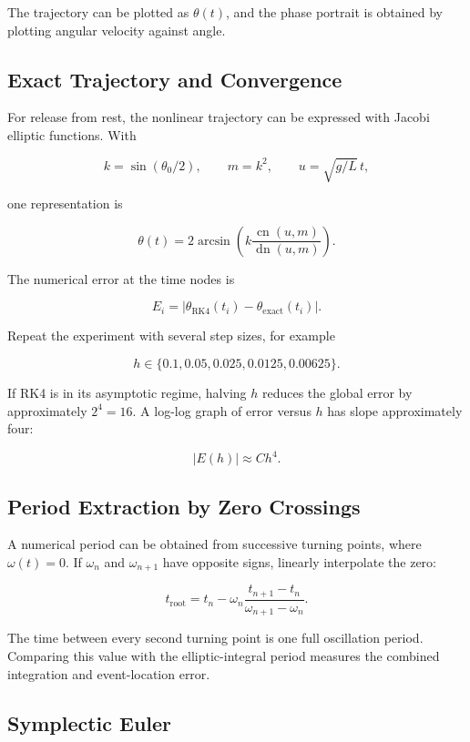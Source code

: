 \documentclass[12pt, a4paper]{article}
\theoremstyle{break}
\begin{document}
The trajectory can be plotted as \(\theta(t)\), and the phase portrait is obtained by plotting angular velocity against angle.

\subsection{Exact Trajectory and Convergence}\label{exact-trajectory-and-convergence}

For release from rest, the nonlinear trajectory can be expressed with Jacobi elliptic functions. With

\[
k=\sin(\theta_0/2),\qquad m=k^2,\qquad u=\sqrt{g/L}\,t,
\]

one representation is

\[
\theta(t)=2\arcsin\left(k\frac{\operatorname{cn}(u,m)}{\operatorname{dn}(u,m)}\right).
\]

The numerical error at the time nodes is

\[
E_i=|\theta_{\mathrm{RK4}}(t_i)-\theta_{\mathrm{exact}}(t_i)|.
\]

Repeat the experiment with several step sizes, for example

\[
h\in\{0.1,0.05,0.025,0.0125,0.00625\}.
\]

If RK4 is in its asymptotic regime, halving \(h\) reduces the global error by approximately \(2^4=16\). A log-log graph of error versus \(h\) has slope approximately four:

\[
|E(h)|\approx Ch^4.
\]

\subsection{Period Extraction by Zero Crossings}\label{period-extraction-by-zero-crossings}

A numerical period can be obtained from successive turning points, where \(\omega(t)=0\). If \(\omega_n\) and \(\omega_{n+1}\) have opposite signs, linearly interpolate the zero:

\[
t_{\mathrm{root}}=t_n-\omega_n\frac{t_{n+1}-t_n}{\omega_{n+1}-\omega_n}.
\]

The time between every second turning point is one full oscillation period. Comparing this value with the elliptic-integral period measures the combined integration and event-location error.

\subsection{Symplectic Euler}\label{symplectic-euler}
\end{document}
